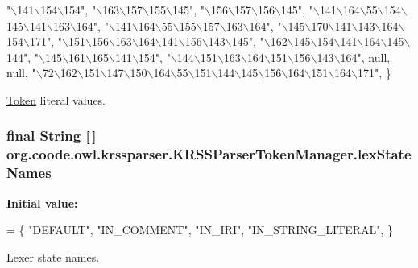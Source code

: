 \begin{DoxyCode}
        \textcolor{stringliteral}{"\(\backslash\)141\(\backslash\)154\(\backslash\)154"}, \textcolor{stringliteral}{"\(\backslash\)163\(\backslash\)157\(\backslash\)155\(\backslash\)145"}, \textcolor{stringliteral}{"\(\backslash\)156\(\backslash\)157\(\backslash\)156\(\backslash\)145"}, \textcolor{stringliteral}{"\(\backslash\)141\(\backslash\)164\(\backslash\)55\(\backslash\)154\(\backslash\)145\(\backslash\)141\(\backslash\)163\(\backslash\)164"},
        \textcolor{stringliteral}{"\(\backslash\)141\(\backslash\)164\(\backslash\)55\(\backslash\)155\(\backslash\)157\(\backslash\)163\(\backslash\)164"}, \textcolor{stringliteral}{"\(\backslash\)145\(\backslash\)170\(\backslash\)141\(\backslash\)143\(\backslash\)164\(\backslash\)154\(\backslash\)171"}, \textcolor{stringliteral}{"\(\backslash\)151\(\backslash\)156\(\backslash\)163\(\backslash\)164\(\backslash\)141\(\backslash\)156\(\backslash\)143\(\backslash\)145"},
        \textcolor{stringliteral}{"\(\backslash\)162\(\backslash\)145\(\backslash\)154\(\backslash\)141\(\backslash\)164\(\backslash\)145\(\backslash\)144"}, \textcolor{stringliteral}{"\(\backslash\)145\(\backslash\)161\(\backslash\)165\(\backslash\)141\(\backslash\)154"}, \textcolor{stringliteral}{"\(\backslash\)144\(\backslash\)151\(\backslash\)163\(\backslash\)164\(\backslash\)151\(\backslash\)156\(\backslash\)143\(\backslash\)164"}, null, 
      null,
        \textcolor{stringliteral}{"\(\backslash\)72\(\backslash\)162\(\backslash\)151\(\backslash\)147\(\backslash\)150\(\backslash\)164\(\backslash\)55\(\backslash\)151\(\backslash\)144\(\backslash\)145\(\backslash\)156\(\backslash\)164\(\backslash\)151\(\backslash\)164\(\backslash\)171"}, \}
\end{DoxyCode}
\hyperlink{classorg_1_1coode_1_1owl_1_1krssparser_1_1_token}{Token} literal values. \hypertarget{classorg_1_1coode_1_1owl_1_1krssparser_1_1_k_r_s_s_parser_token_manager_a65f84346627fe6294d4de253acff7b3b}{
\subsubsection[{lex\-State\-Names}]{\setlength{\rightskip}{0pt plus 5cm}final String \mbox{[}$\,$\mbox{]} org.\-coode.\-owl.\-krssparser.\-K\-R\-S\-S\-Parser\-Token\-Manager.\-lex\-State\-Names\hspace{0.3cm}{\ttfamily [static]}}}\label{classorg_1_1coode_1_1owl_1_1krssparser_1_1_k_r_s_s_parser_token_manager_a65f84346627fe6294d4de253acff7b3b}
{\bfseries Initial value\-:}
\begin{DoxyCode}
= \{
        \textcolor{stringliteral}{"DEFAULT"},
        \textcolor{stringliteral}{"IN\_COMMENT"},
        \textcolor{stringliteral}{"IN\_IRI"},
        \textcolor{stringliteral}{"IN\_STRING\_LITERAL"},
    \}
\end{DoxyCode}
Lexer state names. 

